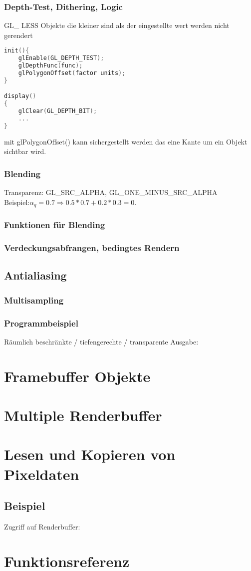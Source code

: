 \subsubsection{Depth-Test, Dithering, Logic}
GL\_ LESS Objekte die kleiner sind als der eingestellte wert werden nicht gerendert
\begin{lstlisting}[language=C++]
init(){
	glEnable(GL_DEPTH_TEST);
	glDepthFunc(func);
	glPolygonOffset(factor units);
}

display()
{
	glClear(GL_DEPTH_BIT);
	...
}
\end{lstlisting}
mit glPolygonOffset() kann sichergestellt werden das eine Kante um ein Objekt sichtbar wird.
\subsubsection{Blending}
Transparenz: GL\_SRC\_ALPHA, GL\_ONE\_MINUS\_SRC\_ALPHA\\
Beispiel:$\alpha_q = 0.7 \Rightarrow 0.5*0.7+0.2*0.3 = 0.$
\subsubsection*{Funktionen für Blending}
\subsubsection{Verdeckungsabfrangen, bedingtes Rendern}
\subsection{Antialiasing}
\subsubsection{Multisampling}
\subsubsection*{Programmbeispiel}
Räumlich beschränkte / tiefengerechte / transparente Ausgabe:
\section{Framebuffer Objekte}
\section{Multiple Renderbuffer}
\section{Lesen und Kopieren von Pixeldaten}
\subsection*{Beispiel}
Zugriff auf Renderbuffer:

\section{Funktionsreferenz}




